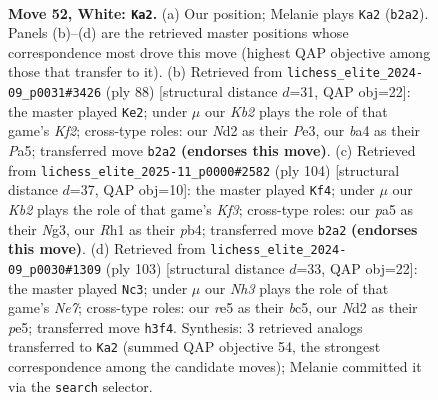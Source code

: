 \documentclass[11pt]{article}
\begin{document}
\clearpage

\begin{figure}[p]\centering
\begin{subfigure}{0.46\textwidth}\centering
\resizebox{\linewidth}{!}{%
\newchessgame
\chessboard[
  setfen={5r2/6k1/1p6/p1p1r3/b7/2P3PN/1K1N1p1P/7R w - - 0 52},
  showmover=false,
  pgfstyle=straightmove, color=movearrow, markmove={b2-a2}
]}
\caption{}
\end{subfigure}\hfill
\begin{subfigure}{0.46\textwidth}\centering
\resizebox{\linewidth}{!}{%
\newchessgame
\chessboard[
  setfen={3r4/7P/p1kb1pN1/Pp2p3/2p5/4P3/P4K2/7R w - - 3 45},
  showmover=false,
  pgfstyle=straightmove, color=movearrow, markmove={f2-e2}
]}
\caption{}
\end{subfigure}
\\[4pt]
\begin{subfigure}{0.46\textwidth}\centering
\resizebox{\linewidth}{!}{%
\newchessgame
\chessboard[
  setfen={6b1/2k1r3/1p5p/2p2P1P/Pp6/1P3KN1/8/1R6 w - - 3 53},
  showmover=false,
  pgfstyle=straightmove, color=movearrow, markmove={f3-f4}
]}
\caption{}
\end{subfigure}\hfill
\begin{subfigure}{0.46\textwidth}\centering
\resizebox{\linewidth}{!}{%
\newchessgame
\chessboard[
  setfen={8/6pp/8/2B1PpPP/R4P2/3k4/P3n1K1/1r6 b - - 12 52},
  showmover=false,
  pgfstyle=straightmove, color=movearrow, markmove={e2-c3}
]}
\caption{}
\end{subfigure}
\caption{\textbf{Move 52, White: \texttt{Ka2}.} (a) Our position; Melanie plays \texttt{Ka2} (\texttt{b2a2}). Panels (b)--(d) are the retrieved master positions whose correspondence most drove this move (highest QAP objective among those that transfer to it). (b) Retrieved from \texttt{lichess\_elite\_2024-09\_p0031\#3426} (ply 88) [structural distance $d$=31, QAP obj=22]: the master played \texttt{Ke2}; under $\mu$ our \emph{Kb2} plays the role of that game's \emph{Kf2}; cross-type roles: our \emph{N}d2 as their \emph{P}e3, our \emph{b}a4 as their \emph{P}a5; transferred move \texttt{b2a2} \textbf{(endorses this move)}. (c) Retrieved from \texttt{lichess\_elite\_2025-11\_p0000\#2582} (ply 104) [structural distance $d$=37, QAP obj=10]: the master played \texttt{Kf4}; under $\mu$ our \emph{Kb2} plays the role of that game's \emph{Kf3}; cross-type roles: our \emph{p}a5 as their \emph{N}g3, our \emph{R}h1 as their \emph{p}b4; transferred move \texttt{b2a2} \textbf{(endorses this move)}. (d) Retrieved from \texttt{lichess\_elite\_2024-09\_p0030\#1309} (ply 103) [structural distance $d$=33, QAP obj=22]: the master played \texttt{Nc3}; under $\mu$ our \emph{Nh3} plays the role of that game's \emph{Ne7}; cross-type roles: our \emph{r}e5 as their \emph{b}c5, our \emph{N}d2 as their \emph{p}e5; transferred move \texttt{h3f4}. Synthesis: 3 retrieved analogs transferred to \texttt{Ka2} (summed QAP objective 54, the strongest correspondence among the candidate moves); Melanie committed it via the \texttt{search} selector.}
\label{fig:thought-m102}
\end{figure}
\end{document}
